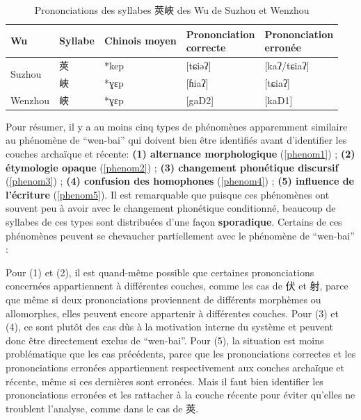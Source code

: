 \documentclass{scrbook}
\newcounter{c}[subsubsection]
\newcommand{\difwenbai}{couches archaïque et récente\xspace}
\begin{document}
\begin{sloppypar}
\begin{table}[htbp]
  \centering
    \begin{tabular}{lllll}
    \toprule
    Wu    & Syllabe & Chinois moyen  & \makecell[l]{Prononciation\\ correcte} & \makecell[l]{Prononciation\\ erronée} \\
    \midrule
    \multirow{2}[2]{*}{Suzhou} & 莢     & *kep  & [tɕiəʔ] & [kaʔ/tɕiaʔ] \\
          & 峽     & *ɣɛp  & [ɦiaʔ] & [tɕiaʔ] \\
    \midrule
    Wenzhou & 峽     & *ɣɛp  & [gaD2] & [kaD1] \\
    \bottomrule
    \end{tabular}%
  \caption{Prononciations des syllabes 莢峽 des Wu de Suzhou et Wenzhou}
  \label{tab:exemple_ecriture}%
\end{table}%

Pour résumer, il y a au moins cinq types de phénomènes apparemment similaire au phénomène de ``wen-bai'' qui doivent bien être identifiés avant d'identifier les \difwenbai : \textbf{(1) alternance morphologique} (\ref{phenom1}) ; \textbf{(2) étymologie opaque} (\ref{phenom2}) ; \textbf{(3) changement phonétique discursif} (\ref{phenom3}) ; \textbf{(4) confusion des homophones} (\ref{phenom4}) ; \textbf{(5) influence de l'écriture} (\ref{phenom5}). Il est remarquable que puisque ces phénomènes ont souvent peu à avoir avec le changement phonétique conditionné, beaucoup de syllabes de ces types sont distribuées d'une façon \textbf{sporadique}.  Certains de ces phénomènes peuvent se chevaucher partiellement avec le phénomène de ``wen-bai'' : 

Pour (1) et (2), il est quand-même possible que certaines prononciations concernées appartiennent à différentes couches, comme les cas de 伏 et 射, parce que même si deux prononciations proviennent de différents morphèmes ou allomorphes, elles peuvent encore appartenir à différentes couches. Pour (3) et (4), ce sont plutôt des cas dûs à la motivation interne du système et peuvent donc être directement exclus de ``wen-bai''. Pour (5), la situation est moins problématique que les cas précédents, parce que les prononciations correctes et les prononciations erronées appartiennent respectivement aux \difwenbai, même si ces dernières sont erronées. Mais il faut bien identifier les prononciations erronées et les rattacher à la couche récente pour éviter qu'elles ne troublent l'analyse, comme dans le cas de 莢.


\end{sloppypar}
\end{document}
